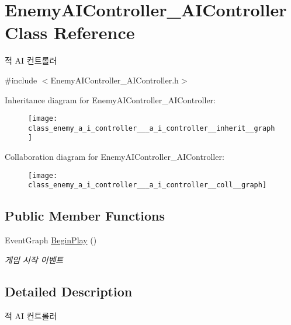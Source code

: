 \hypertarget{class_enemy_a_i_controller___a_i_controller}{}\section{Enemy\+A\+I\+Controller\+\_\+\+A\+I\+Controller Class Reference}
\label{class_enemy_a_i_controller___a_i_controller}


적 AI 컨트롤러  




{\ttfamily \#include $<$Enemy\+A\+I\+Controller\+\_\+\+A\+I\+Controller.\+h$>$}



Inheritance diagram for Enemy\+A\+I\+Controller\+\_\+\+A\+I\+Controller\+:\nopagebreak
\begin{figure}[H]
\begin{center}
\leavevmode
\texttt{[image: class\_enemy\_a\_i\_controller\_\_\_a\_i\_controller\_\_inherit\_\_graph]}
\end{center}
\end{figure}


Collaboration diagram for Enemy\+A\+I\+Controller\+\_\+\+A\+I\+Controller\+:\nopagebreak
\begin{figure}[H]
\begin{center}
\leavevmode
\texttt{[image: class\_enemy\_a\_i\_controller\_\_\_a\_i\_controller\_\_coll\_\_graph]}
\end{center}
\end{figure}
\subsection*{Public Member Functions}
\begin{DoxyCompactItemize}
\item 
Event\+Graph \hyperlink{class_enemy_a_i_controller___a_i_controller_ae3c3a76e769cd197ed32402d76d7764c}{Begin\+Play} ()
\begin{DoxyCompactList}\small\item\em 게임 시작 이벤트 \end{DoxyCompactList}\end{DoxyCompactItemize}


\subsection{Detailed Description}
적 AI 컨트롤러 

